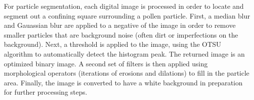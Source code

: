 For particle segmentation, each digital image is processed in order to locate and segment out a confining square surrounding a pollen particle. First, a median blur and Gauassian blur are applied to a negative of the image in order to remove smaller particles that are background noise (often dirt or imperfections on the background). 
Next, a threshold is applied to the image, using the OTSU algorithm to automatically detect the histogram peak. The returned image is an optimized binary image. A second set of filters is then applied using morphological operators (iterations of erosions and dilations) to fill in the particle area. Finally, the image is converted to have a white background in preparation for further processing steps.
  
  
  
  
  
  